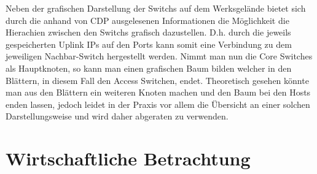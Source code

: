 Neben der grafischen Darstellung der Switchs auf dem Werksgelände bietet sich durch die anhand von CDP ausgelesenen Informationen die Möglichkeit die Hierachien zwischen den Switchs grafisch dazustellen. D.h. durch die jeweils gespeicherten Uplink IPs auf den Ports kann somit eine Verbindung zu dem jeweiligen Nachbar-Switch hergestellt werden. Nimmt man nun die Core Switches als Hauptknoten, so kann man einen grafischen Baum bilden welcher in den Blättern, in diesem Fall den Access Switchen, endet. Theoretisch gesehen könnte man aus den Blättern ein weiteren Knoten machen und den Baum bei den Hosts enden lassen, jedoch leidet in der Praxis vor allem die Übersicht an einer solchen Darstellungsweise und wird daher abgeraten zu verwenden.

\section{Wirtschaftliche Betrachtung}
\label{sec:economicloverview}